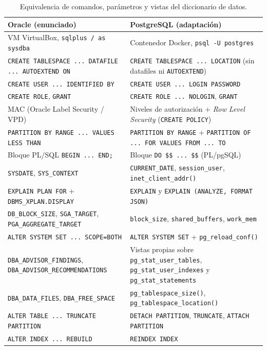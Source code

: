 \documentclass[12pt,a4paper]{article}
\begin{document}
\begin{table}[H]
\centering
\small
\renewcommand{\arraystretch}{1.3}
\begin{tabular}{p{}p{}}
\toprule
\textbf{Oracle (enunciado)} & \textbf{PostgreSQL (adaptación)} \\
\midrule
VM VirtualBox, \texttt{sqlplus / as sysdba} & Contenedor Docker, \texttt{psql -U postgres} \\
\texttt{CREATE TABLESPACE ... DATAFILE ... AUTOEXTEND ON} & \texttt{CREATE TABLESPACE ... LOCATION} (sin datafiles ni \texttt{AUTOEXTEND}) \\
\texttt{CREATE USER ... IDENTIFIED BY} & \texttt{CREATE USER ... LOGIN PASSWORD} \\
\texttt{CREATE ROLE}, \texttt{GRANT} & \texttt{CREATE ROLE ... NOLOGIN}, \texttt{GRANT} \\
MAC (Oracle Label Security / VPD) & Niveles de autorización + \textit{Row Level Security} (\texttt{CREATE POLICY}) \\
\texttt{PARTITION BY RANGE ... VALUES LESS THAN} & \texttt{PARTITION BY RANGE} + \texttt{PARTITION OF ... FOR VALUES FROM ... TO} \\
Bloque PL/SQL \texttt{BEGIN ... END;} & Bloque \texttt{DO \$\$ ... \$\$} (PL/pgSQL) \\
\texttt{SYSDATE}, \texttt{SYS\_\allowbreak{}CONTEXT} & \texttt{CURRENT\_\allowbreak{}DATE}, \texttt{session\_\allowbreak{}user}, \texttt{inet\_\allowbreak{}client\_\allowbreak{}addr()} \\
\texttt{EXPLAIN PLAN FOR} + \texttt{DBMS\_\allowbreak{}XPLAN.DISPLAY} & \texttt{EXPLAIN} y \texttt{EXPLAIN (ANALYZE, FORMAT JSON)} \\
\texttt{DB\_\allowbreak{}BLOCK\_\allowbreak{}SIZE}, \texttt{SGA\_\allowbreak{}TARGET}, \texttt{PGA\_\allowbreak{}AGGREGATE\_\allowbreak{}TARGET} & \texttt{block\_\allowbreak{}size}, \texttt{shared\_\allowbreak{}buffers}, \texttt{work\_\allowbreak{}mem} \\
\texttt{ALTER SYSTEM SET ... SCOPE=BOTH} & \texttt{ALTER SYSTEM SET} + \texttt{pg\_\allowbreak{}reload\_\allowbreak{}conf()} \\
\texttt{DBA\_\allowbreak{}ADVISOR\_\allowbreak{}FINDINGS}, \texttt{DBA\_\allowbreak{}ADVISOR\_\allowbreak{}RECOMMENDATIONS} & Vistas propias sobre \texttt{pg\_\allowbreak{}stat\_\allowbreak{}user\_\allowbreak{}tables}, \texttt{pg\_\allowbreak{}stat\_\allowbreak{}user\_\allowbreak{}indexes} y \texttt{pg\_\allowbreak{}stat\_\allowbreak{}statements} \\
\texttt{DBA\_\allowbreak{}DATA\_\allowbreak{}FILES}, \texttt{DBA\_\allowbreak{}FREE\_\allowbreak{}SPACE} & \texttt{pg\_\allowbreak{}tablespace\_\allowbreak{}size()}, \texttt{pg\_\allowbreak{}tablespace\_\allowbreak{}location()} \\
\texttt{ALTER TABLE ... TRUNCATE PARTITION} & \texttt{DETACH PARTITION}, \texttt{TRUNCATE}, \texttt{ATTACH PARTITION} \\
\texttt{ALTER INDEX ... REBUILD} & \texttt{REINDEX INDEX} \\
\bottomrule
\end{tabular}
\caption{Equivalencia de comandos, parámetros y vistas del diccionario de datos.}
\end{table}
\end{document}
